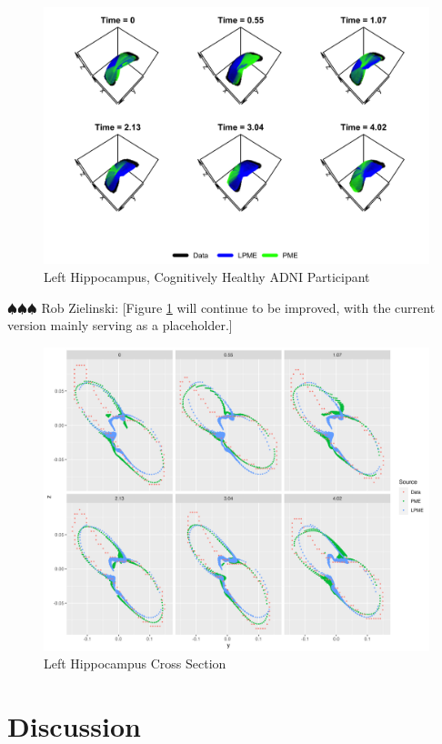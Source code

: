 \documentclass[11pt,reqno]{article}
\renewcommand{\textwidth}{180mm}
\newcommand{\zielinski}[1]{{\color{blue} \sf $\spadesuit\spadesuit\spadesuit$ Rob Zielinski: [#1]}}
\theoremstyle{definition}
\begin{document}
\begin{figure}
  \centering
  \includegraphics[width=\textwidth]{adni_lhipp}
  \caption{Left Hippocampus, Cognitively Healthy ADNI Participant}
  \label{fig:adni_result}
\end{figure}

\zielinski{Figure \ref{fig:adni_result} will continue to be improved, with the current version mainly serving as a placeholder.}


\begin{figure}[h]
  \centering
  \includegraphics[width=\textwidth]{adni_lhipp_cross_section}
  \caption{Left Hippocampus Cross Section}
  \label{fig:adni_cross_section}
\end{figure}

\section{Discussion}
\end{document}
